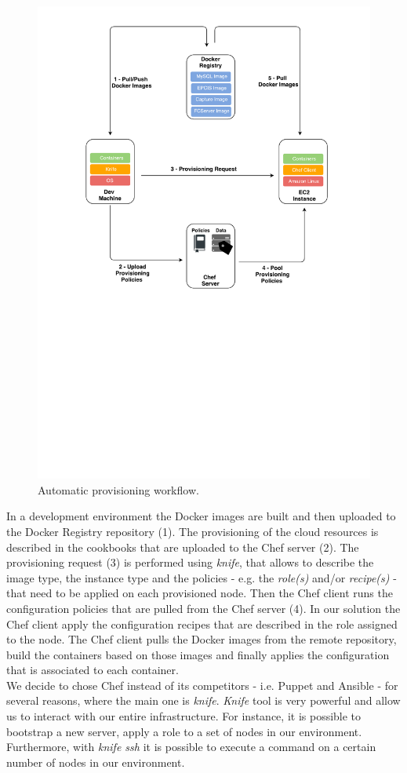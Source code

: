 \begin{figure}[ht!]
  \centering
  \includegraphics[width=.5\textwidth]{./figures/c4t-tech-architecture}
  \caption[Automatic provisioning workflow.]{Automatic provisioning workflow.}
  \label{fig:provisioning_tech_architecture}
\end{figure}

In a development environment the Docker images are built and then uploaded to the Docker Registry
repository (1). The provisioning of the cloud resources is described in the cookbooks that are uploaded
to the Chef server (2). The provisioning request (3) is performed using \textit{knife}, that allows to
describe the image type, the instance type and the policies - e.g. the \textit{role(s)} and/or \textit{recipe(s)} -
that need to be applied on each provisioned node. Then the Chef client runs the configuration policies
that are pulled from the Chef server (4). In our solution the Chef client apply the configuration recipes
that are described in the role assigned to the node. The Chef client pulls the Docker images from the
remote repository, build the containers based on those images and finally applies the configuration
that is associated to each container.\\

We decide to chose Chef instead of its competitors - i.e. Puppet and Ansible - for several
reasons, where the main one is \textit{knife}. \textit{Knife} tool is very powerful and allow us to
interact with our entire infrastructure. For instance, it is possible to bootstrap a new server,
apply a role to a set of nodes in our environment. Furthermore, with \textit{knife ssh} it is
possible to execute a command on a certain number of nodes in our environment.\\
